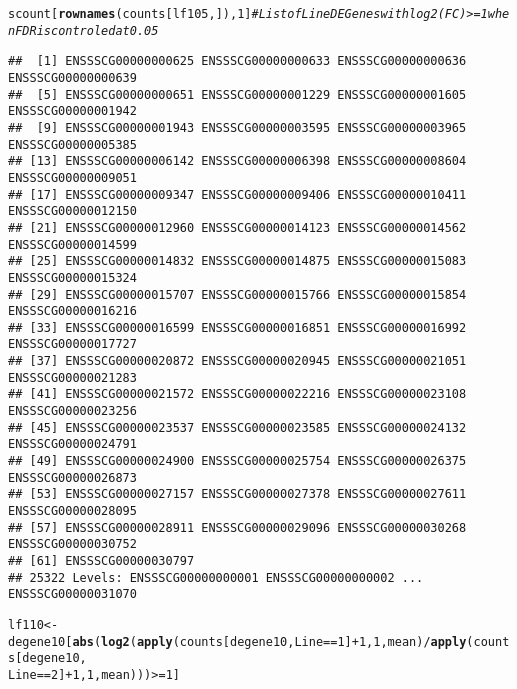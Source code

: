 \documentclass{article}\usepackage[]{graphicx}\usepackage[]{color}
\makeatletter
\newcommand{\hlnum}[1]{\textcolor[rgb]{0.686,0.059,0.569}{#1}}%
\newcommand{\hlcom}[1]{\textcolor[rgb]{0.678,0.584,0.686}{\textit{#1}}}%
\newcommand{\hlopt}[1]{\textcolor[rgb]{0,0,0}{#1}}%
\newcommand{\hlstd}[1]{\textcolor[rgb]{0.345,0.345,0.345}{#1}}%
\newcommand{\hlkwb}[1]{\textcolor[rgb]{0.69,0.353,0.396}{#1}}%
\newcommand{\hlkwd}[1]{\textcolor[rgb]{0.737,0.353,0.396}{\textbf{#1}}}%
\newenvironment{kframe}{%
 \def\at@end@of@kframe{}%
 \ifinner\ifhmode%
  \def\at@end@of@kframe{\end{minipage}}%
  \begin{minipage}{\columnwidth}%
 \fi\fi%
 \def\FrameCommand##1{\hskip\@totalleftmargin \hskip-\fboxsep
 \colorbox{shadecolor}{##1}\hskip-\fboxsep
     \hskip-\linewidth \hskip-\@totalleftmargin \hskip\columnwidth}%
 \MakeFramed {\advance\hsize-\width
   \@totalleftmargin\z@ \linewidth\hsize
   \@setminipage}}%
 {\par\unskip\endMakeFramed%
 \at@end@of@kframe}
\newenvironment{knitrout}{}{} %
\makeatother
\begin{document}
\begin{knitrout}
\begin{kframe}
\begin{alltt}
\hlstd{scount[}\hlkwd{rownames}\hlstd{(counts[lf105, ]),} \hlnum{1}\hlstd{]}  \hlcom{# List of  Line DE Genes with log2(FC) >=1 when FDR is controled at 0.05}
\end{alltt}
\begin{verbatim}
##  [1] ENSSSCG00000000625 ENSSSCG00000000633 ENSSSCG00000000636 ENSSSCG00000000639
##  [5] ENSSSCG00000000651 ENSSSCG00000001229 ENSSSCG00000001605 ENSSSCG00000001942
##  [9] ENSSSCG00000001943 ENSSSCG00000003595 ENSSSCG00000003965 ENSSSCG00000005385
## [13] ENSSSCG00000006142 ENSSSCG00000006398 ENSSSCG00000008604 ENSSSCG00000009051
## [17] ENSSSCG00000009347 ENSSSCG00000009406 ENSSSCG00000010411 ENSSSCG00000012150
## [21] ENSSSCG00000012960 ENSSSCG00000014123 ENSSSCG00000014562 ENSSSCG00000014599
## [25] ENSSSCG00000014832 ENSSSCG00000014875 ENSSSCG00000015083 ENSSSCG00000015324
## [29] ENSSSCG00000015707 ENSSSCG00000015766 ENSSSCG00000015854 ENSSSCG00000016216
## [33] ENSSSCG00000016599 ENSSSCG00000016851 ENSSSCG00000016992 ENSSSCG00000017727
## [37] ENSSSCG00000020872 ENSSSCG00000020945 ENSSSCG00000021051 ENSSSCG00000021283
## [41] ENSSSCG00000021572 ENSSSCG00000022216 ENSSSCG00000023108 ENSSSCG00000023256
## [45] ENSSSCG00000023537 ENSSSCG00000023585 ENSSSCG00000024132 ENSSSCG00000024791
## [49] ENSSSCG00000024900 ENSSSCG00000025754 ENSSSCG00000026375 ENSSSCG00000026873
## [53] ENSSSCG00000027157 ENSSSCG00000027378 ENSSSCG00000027611 ENSSSCG00000028095
## [57] ENSSSCG00000028911 ENSSSCG00000029096 ENSSSCG00000030268 ENSSSCG00000030752
## [61] ENSSSCG00000030797
## 25322 Levels: ENSSSCG00000000001 ENSSSCG00000000002 ... ENSSSCG00000031070
\end{verbatim}
\begin{alltt}
\hlstd{lf110} \hlkwb{<-} \hlstd{degene10[}\hlkwd{abs}\hlstd{(}\hlkwd{log2}\hlstd{(}\hlkwd{apply}\hlstd{(counts[degene10, Line} \hlopt{==} \hlnum{1}\hlstd{]} \hlopt{+} \hlnum{1}\hlstd{,} \hlnum{1}\hlstd{, mean)}\hlopt{/}\hlkwd{apply}\hlstd{(counts[degene10,}
    \hlstd{Line} \hlopt{==} \hlnum{2}\hlstd{]} \hlopt{+} \hlnum{1}\hlstd{,} \hlnum{1}\hlstd{, mean)))} \hlopt{>=} \hlnum{1}\hlstd{]}


\end{alltt}
\end{kframe}
\end{knitrout}
\end{document}
